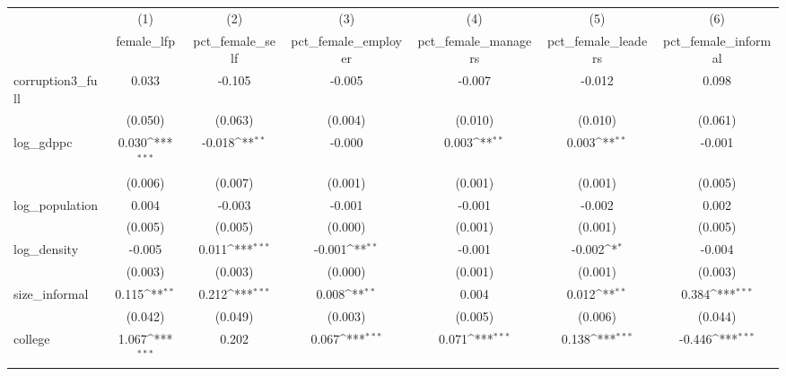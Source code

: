 {
\def\sym#1{\ifmmode^{#1}\else\(^{#1}\)\fi}
\begin{tabular}{l*{6}{c}}
\hline\hline
            &\multicolumn{1}{c}{(1)}&\multicolumn{1}{c}{(2)}&\multicolumn{1}{c}{(3)}&\multicolumn{1}{c}{(4)}&\multicolumn{1}{c}{(5)}&\multicolumn{1}{c}{(6)}\\
            &\multicolumn{1}{c}{female\_lfp}&\multicolumn{1}{c}{pct\_female\_self}&\multicolumn{1}{c}{pct\_female\_employer}&\multicolumn{1}{c}{pct\_female\_managers}&\multicolumn{1}{c}{pct\_female\_leaders}&\multicolumn{1}{c}{pct\_female\_informal}\\
\hline
corruption3\_full&       0.033         &      -0.105         &      -0.005         &      -0.007         &      -0.012         &       0.098         \\
            &     (0.050)         &     (0.063)         &     (0.004)         &     (0.010)         &     (0.010)         &     (0.061)         \\
[1em]
log\_gdppc   &       0.030\sym{***}&      -0.018\sym{**} &      -0.000         &       0.003\sym{**} &       0.003\sym{**} &      -0.001         \\
            &     (0.006)         &     (0.007)         &     (0.001)         &     (0.001)         &     (0.001)         &     (0.005)         \\
[1em]
log\_population&       0.004         &      -0.003         &      -0.001         &      -0.001         &      -0.002         &       0.002         \\
            &     (0.005)         &     (0.005)         &     (0.000)         &     (0.001)         &     (0.001)         &     (0.005)         \\
[1em]
log\_density &      -0.005         &       0.011\sym{***}&      -0.001\sym{**} &      -0.001         &      -0.002\sym{*}  &      -0.004         \\
            &     (0.003)         &     (0.003)         &     (0.000)         &     (0.001)         &     (0.001)         &     (0.003)         \\
[1em]
size\_informal&       0.115\sym{**} &       0.212\sym{***}&       0.008\sym{**} &       0.004         &       0.012\sym{**} &       0.384\sym{***}\\
            &     (0.042)         &     (0.049)         &     (0.003)         &     (0.005)         &     (0.006)         &     (0.044)         \\
[1em]
college     &       1.067\sym{***}&       0.202         &       0.067\sym{***}&       0.071\sym{***}&       0.138\sym{***}&      -0.446\sym{***}\\

\end{tabular}}
